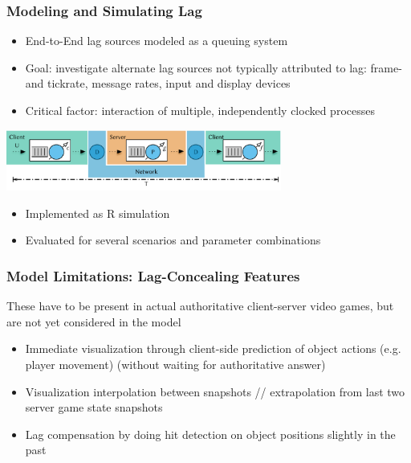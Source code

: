 \documentclass{UDEbeamerEN}
\begin{document}
\begin{frame}
	\frametitle{Modeling and Simulating Lag}

	\begin{itemize}
		\item End-to-End lag sources modeled as a queuing system
		\item Goal: investigate alternate lag sources not typically attributed to lag: frame- and tickrate, message rates, input and display devices
		\item Critical factor: interaction of multiple, independently clocked processes
	\end{itemize}

	\begin{center}
		\includegraphics[height=2cm]{../../../models/e2e-lag-model.pdf}
	\end{center}

	\begin{itemize}
		\item Implemented as R simulation
		\item Evaluated for several scenarios and parameter combinations
	\end{itemize}

\end{frame}


\begin{frame}
	\frametitle{Model Limitations: Lag-Concealing Features}
		These have to be present in actual authoritative client-server video games, but are not yet considered in the model
	\begin{itemize}
		\item Immediate visualization through client-side prediction of object actions (e.g. player movement) (without waiting for authoritative answer)
		\item Visualization interpolation between snapshots // extrapolation from last two server game state snapshots
		\item Lag compensation by doing hit detection on object positions slightly in the past
	\end{itemize}
\end{frame}
\end{document}
